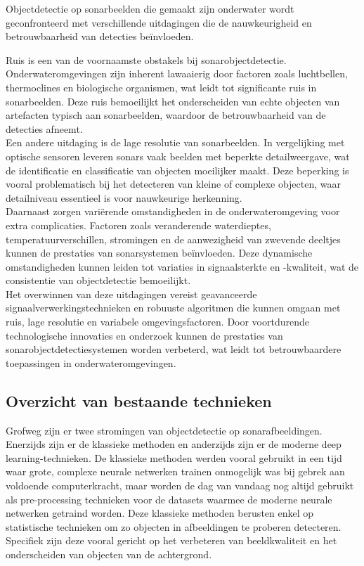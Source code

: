 Objectdetectie op sonarbeelden die gemaakt zijn onderwater wordt geconfronteerd met verschillende uitdagingen die de nauwkeurigheid en betrouwbaarheid van detecties beïnvloeden.

Ruis is een van de voornaamste obstakels bij sonarobjectdetectie. Onderwateromgevingen zijn inherent lawaaierig door factoren zoals luchtbellen, \glspl{thermocline} en biologische organismen, wat leidt tot significante ruis in sonarbeelden. Deze ruis bemoeilijkt het onderscheiden van echte objecten van artefacten typisch aan sonarbeelden, waardoor de betrouwbaarheid van de detecties afneemt. \autocite{Aubard_2024_Datasets} \\

Een andere uitdaging is de lage resolutie van sonarbeelden. In vergelijking met optische sensoren leveren sonars vaak beelden met beperkte detailweergave, wat de identificatie en classificatie van objecten moeilijker maakt. Deze beperking is vooral problematisch bij het detecteren van kleine of complexe objecten, waar detailniveau essentieel is voor nauwkeurige herkenning. \autocite{Lee_2018} \\

Daarnaast zorgen variërende omstandigheden in de onderwateromgeving voor extra complicaties. Factoren zoals veranderende waterdieptes, temperatuurverschillen, stromingen en de aanwezigheid van zwevende deeltjes kunnen de prestaties van sonarsystemen beïnvloeden. Deze dynamische omstandigheden kunnen leiden tot variaties in signaalsterkte en -kwaliteit, wat de consistentie van objectdetectie bemoeilijkt. \autocite{Valdenegro_Toro_2019} \\

Het overwinnen van deze uitdagingen vereist geavanceerde signaalverwerkingstechnieken en robuuste algoritmen die kunnen omgaan met ruis, lage resolutie en variabele omgevingsfactoren. Door voortdurende technologische innovaties en onderzoek kunnen de prestaties van sonarobjectdetectiesystemen worden verbeterd, wat leidt tot betrouwbaardere toepassingen in onderwateromgevingen.

\subsection{Overzicht van bestaande technieken}

Grofweg zijn er twee stromingen van objectdetectie op sonarafbeeldingen. Enerzijds zijn er de klassieke methoden en anderzijds zijn er de moderne deep learning-technieken. De klassieke methoden werden vooral gebruikt in een tijd waar grote, complexe neurale netwerken trainen onmogelijk was bij gebrek aan voldoende computerkracht, maar worden de dag van vandaag nog altijd gebruikt als pre-processing technieken voor de datasets waarmee de moderne neurale netwerken getraind worden. Deze klassieke methoden berusten enkel op statistische technieken om zo objecten in afbeeldingen te proberen detecteren. Specifiek zijn deze vooral gericht op het verbeteren van beeldkwaliteit en het onderscheiden van objecten van de achtergrond.

